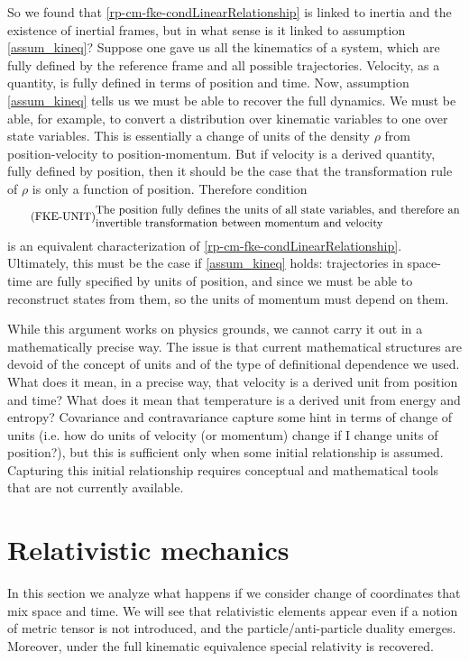 So we found that \ref{rp-cm-fke-condLinearRelationship} is linked to inertia and the existence of inertial frames, but in what sense is it linked to assumption \ref{assum_kineq}? Suppose one gave us all the kinematics of a system, which are fully defined by the reference frame and all possible trajectories. Velocity, as a quantity, is fully defined in terms of position and time. Now, assumption \ref{assum_kineq} tells us we must be able to recover the full dynamics. We must be able, for example, to convert a distribution over kinematic variables to one over state variables. This is essentially a change of units of the density $\rho$ from position-velocity to position-momentum. But if velocity is a derived quantity, fully defined by position, then it should be the case that the transformation rule of $\rho$ is only a function of position. Therefore condition
\begin{equation}\label{rp-cm-fke-condUnits}
	\tag{FKE-UNIT}
	\eqtext{The position fully defines the units of all state variables, and therefore an invertible transformation between momentum and velocity}
\end{equation}
is an equivalent characterization of \ref{rp-cm-fke-condLinearRelationship}. Ultimately, this must be the case if \ref{assum_kineq} holds: trajectories in space-time are fully specified by units of position, and since we must be able to reconstruct states from them, so the units of momentum must depend on them.

While this argument works on physics grounds, we cannot carry it out in a mathematically precise way. The issue is that current mathematical structures are devoid of the concept of units and of the type of definitional dependence we used. What does it mean, in a precise way, that velocity is a derived unit from position and time? What does it mean that temperature is a derived unit from energy and entropy? Covariance and contravariance capture some hint in terms of change of units (i.e. how do units of velocity (or momentum) change if I change units of position?), but this is sufficient only when some initial relationship is assumed. Capturing this initial relationship requires conceptual and mathematical tools that are not currently available.

\section{Relativistic mechanics}

In this section we analyze what happens if we consider change of coordinates that mix space and time. We will see that relativistic elements appear even if a notion of metric tensor is not introduced, and the particle/anti-particle duality emerges. Moreover, under the full kinematic equivalence special relativity is recovered.

